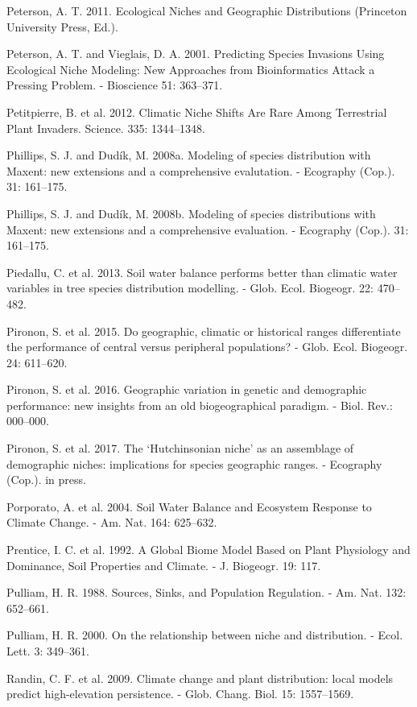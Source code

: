 \documentclass[11pt,twoside]{reedthesis}
\begin{document}
Peterson, A. T. 2011. Ecological Niches and Geographic Distributions
(Princeton University Press, Ed.).\par
Peterson, A. T. and Vieglais, D. A. 2001. Predicting Species Invasions
Using Ecological Niche Modeling: New Approaches from Bioinformatics
Attack a Pressing Problem. - Bioscience 51: 363--371.\par
Petitpierre, B. et al. 2012. Climatic Niche Shifts Are Rare Among
Terrestrial Plant Invaders. Science. 335: 1344--1348.\par
Phillips, S. J. and Dudík, M. 2008a. Modeling of species distribution
with Maxent: new extensions and a comprehensive evalutation. - Ecography
(Cop.). 31: 161--175.\par
Phillips, S. J. and Dudík, M. 2008b. Modeling of species distributions
with Maxent: new extensions and a comprehensive evaluation. - Ecography
(Cop.). 31: 161--175.\par
Piedallu, C. et al. 2013. Soil water balance performs better than
climatic water variables in tree species distribution modelling. - Glob.
Ecol. Biogeogr. 22: 470--482.\par
Pironon, S. et al. 2015. Do geographic, climatic or historical ranges
differentiate the performance of central versus peripheral populations?
- Glob. Ecol. Biogeogr. 24: 611--620.\par
Pironon, S. et al. 2016. Geographic variation in genetic and demographic
performance: new insights from an old biogeographical paradigm. - Biol.
Rev.: 000--000.\par
Pironon, S. et al. 2017. The `Hutchinsonian niche' as an assemblage of
demographic niches: implications for species geographic ranges. -
Ecography (Cop.). in press.\par
Porporato, A. et al. 2004. Soil Water Balance and Ecosystem Response to
Climate Change. - Am. Nat. 164: 625--632.\par
Prentice, I. C. et al. 1992. A Global Biome Model Based on Plant
Physiology and Dominance, Soil Properties and Climate. - J. Biogeogr.
19: 117.\par
Pulliam, H. R. 1988. Sources, Sinks, and Population Regulation. - Am.
Nat. 132: 652--661.\par
Pulliam, H. R. 2000. On the relationship between niche and distribution.
- Ecol. Lett. 3: 349--361.\par
Randin, C. F. et al. 2009. Climate change and plant distribution: local
models predict high-elevation persistence. - Glob. Chang. Biol. 15:
1557--1569.\par
\end{document}
